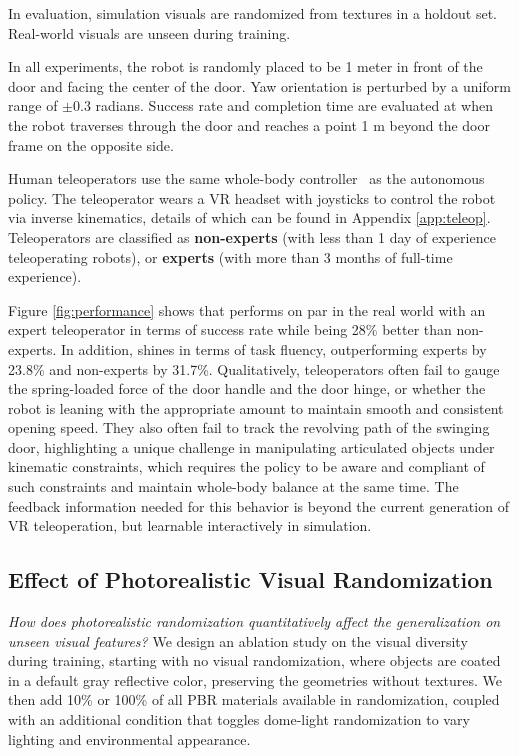 In evaluation, simulation visuals are randomized from textures in a holdout set. Real-world visuals are unseen during training.

In all experiments, the robot is randomly placed to be 1 meter in front of the door and facing the center of the door. Yaw orientation is perturbed by a uniform range of $\pm 0.3$ radians. Success rate and completion time are evaluated at when the robot traverses through the door and reaches a point 1 m beyond the door frame on the opposite side.

 Human teleoperators use the same whole-body controller~\citep{ben2025homie} as the autonomous policy. The teleoperator wears a VR headset with joysticks to control the robot via inverse kinematics, details of which can be found in Appendix \ref{app:teleop}. Teleoperators are classified as \textbf{non-experts} (with less than 1 day of experience teleoperating robots), or \textbf{experts} (with more than 3 months of full-time experience).

Figure \ref{fig:performance} shows that \method{} performs on par in the real world with an expert teleoperator in terms of success rate while being 28\% better than non-experts. In addition, \method{} shines in terms of task fluency, outperforming experts by 23.8\% and non-experts by 31.7\%. Qualitatively, teleoperators often fail to gauge the spring-loaded force of the door handle and the door hinge, or whether the robot is leaning with the appropriate amount to maintain smooth and consistent opening speed. They also often fail to track the revolving path of the swinging door, highlighting a unique challenge in manipulating articulated objects under kinematic constraints, which requires the policy to be aware and compliant of such constraints and maintain whole-body balance at the same time. The feedback information needed for this behavior is beyond the current generation of VR teleoperation, but learnable interactively in simulation.

\subsection{Effect of Photorealistic Visual Randomization}

\textit{How does photorealistic randomization quantitatively affect the generalization on unseen visual features?} We design an ablation study on the visual diversity during training, starting with no visual randomization, where objects are coated in a default gray reflective color, preserving the geometries without textures. We then add 10\% or 100\% of all PBR materials available in randomization, coupled with an additional condition that toggles dome-light randomization to vary lighting and environmental appearance.

